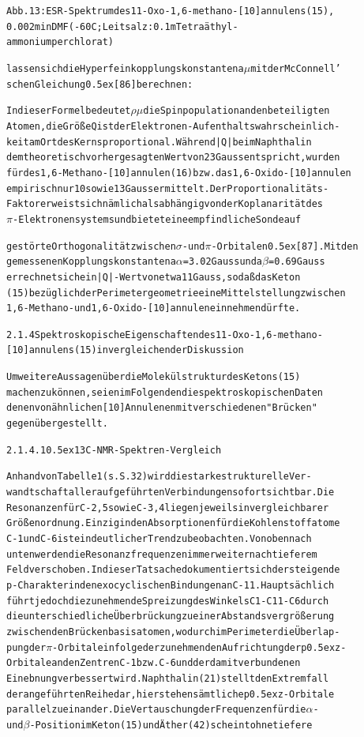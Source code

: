 \documentclass[a4paper,11pt]{article}
\begin{document}
\begin{alltt}
Abb. 13: ESR-Spektrum des 11-Oxo-1‚6-methano-[10]annulens (15),
0.002 m in DMF (-60\degree{}C; Leitsalz: 0.1 m Tetraäthyl-
ammoniumperchlorat)

lassen sich die Hyperfeinkopplungskonstanten a\(\mu\) mit der McConnell'
schen Gleichung \raise0.5ex\hbox{[86]} berechnen:


In dieser Formel bedeutet \(\rho\mu\)  die Spinpopulation an den beteiligten
Atomen, die Größe Q ist der Elektronen-Aufenthaltswahrscheinlich-
keit am Ort des Kerns proportional. Während |Q| beim Naphthalin
dem theoretisch vorhergesagten Wert von 23 Gauss entspricht, wurden
für des 1,6-Methano-[10]annulen (16) bzw. das 1,6-Oxido-[10]annulen
empirisch nur 10 sowie 13 Gauss ermittelt. Der Proportionalitäts-
Faktor erweist sich nämlich als abhängig von der Koplanarität des
\(\pi\)-Elektronensystems und bietet eine empfindliche Sonde auf

\newpage
{}


gestörte Orthogonalität zwischen \(\sigma\)- und \(\pi\)-Orbitalen \raise0.5ex\hbox{[87]}. Mit den
gemessenen Kopplungskonstanten a\(\alpha\) = 3.02 Gauss und a\(\beta\) = 0.69 Gauss
errechnet sich ein |Q|-Wert von etwa 11 Gauss, so daß das Keton
(15) bezüglich der Perimetergeometrie eine Mittelstellung zwischen
1,6-Methano- und 1,6-Oxido-[10]annulen einnehmen dürfte.


2.1.4 Spektroskopische Eigenschaften des 11-Oxo-1‚6-methano-
[10]annulens (15) in vergleichender Diskussion

Um weitere Aussagen über die Molekülstruktur des Ketons (15)
machen zu können, seien im Folgenden die spektroskopischen Daten
denen von ähnlichen [10]Annulenen mit verschiedenen "Brücken"
gegenübergestellt.


2.1.4.1 \raise0.5ex\hbox{13}C-NMR-Spektren-Vergleich

Anhand von Tabelle 1 (s. S. 32) wird die starke strukturelle Ver-
wandtschaft aller aufgeführten Verbindungen sofort sichtbar. Die
Resonanzen für C-2,5 sowie C-3,4 liegen jeweils in vergleichbarer
Größenordnung. Einzig in den Absorptionen für die Kohlenstoffatome
C-1 und C-6 ist ein deutlicher Trend zu beobachten. Von oben nach
unten werden die Resonanzfrequenzen immer weiter nach tieferem
Feld verschoben. In dieser Tatsache dokumentiert sich der steigende
p-Charakter in den exocyclischen Bindungen an C-11. Hauptsächlich
führt jedoch die zunehmende Spreizung des Winkels C1-C11-C6 durch
die unterschiedliche Überbrückung zu einer Abstandsvergrößerung
zwischen den Brückenbasisatomen, wodurch im Perimeter die Überlap-
pung der \(\pi\)-Orbitale infolge der zunehmenden Aufrichtung der p\lower0.5ex\hbox{z} -
Orbitale an den Zentren C-1 bzw. C-6 und der damit verbundenen
Einebnung verbessert wird. Naphthalin (21) stellt den Extremfall
der angeführten Reihe dar, hier stehen sämtliche p\lower0.5ex\hbox{z} - Orbitale
parallel zueinander. Die Vertauschung der Frequenzen für die \(\alpha\)-
und \(\beta\)-Position im Keton (15) und Äther (42) scheint ohne tiefere


\end{alltt}
\end{document}
